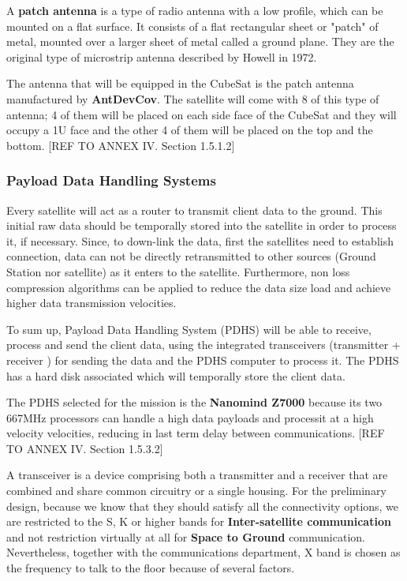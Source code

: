 A \textbf{patch antenna} is a type of radio antenna with a low profile, which can be mounted on a flat surface. It consists of a flat rectangular sheet or "patch" of metal, mounted over a larger sheet of metal called a ground plane. They are the original type of microstrip antenna described by Howell in 1972. \cite{patch}

The antenna that will be equipped in the CubeSat is the patch antenna manufactured by \textbf{AntDevCov}. The satellite will come with 8 of this type of antenna; 4 of them will be placed on each side face of the CubeSat and they will occupy a 1U face and the other 4 of them will be placed on the top and the bottom. [{REF TO ANNEX IV. Section 1.5.1.2}]

\subsubsection{Payload Data Handling Systems}
Every satellite will act as a router to transmit client data to the ground. This initial raw data should be temporally stored into the satellite in order to process it, if necessary. Since, to down-link the data, first the satellites need to establish connection, data can not be directly retransmitted to other sources (Ground Station nor satellite) as it enters to the satellite. Furthermore, non loss compression algorithms can be applied to reduce the data size load and achieve higher data transmission velocities.

To sum up, Payload Data Handling System (PDHS) will be able to receive, process and send the client data, using the integrated transceivers (transmitter + receiver )  for sending the data and the PDHS computer to process it. The PDHS has a hard disk associated which will temporally store the client data.

The PDHS selected for the mission is the \textbf{Nanomind Z7000} because its two 667MHz processors can handle a high data payloads and processit at a high velocity velocities, reducing in last term delay between communications.  [{REF TO ANNEX IV. Section 1.5.3.2}]

A transceiver is a device comprising both a transmitter and a receiver that are combined and share common circuitry or a single housing. For the preliminary design, because we know that they should satisfy all the connectivity options, we are restricted to the S, K or higher bands for \textbf{Inter-satellite communication} and not restriction virtually at all for \textbf{Space to Ground} communication. Nevertheless, together with the communications department, X band is chosen as the frequency to talk to the floor because of several factors.

